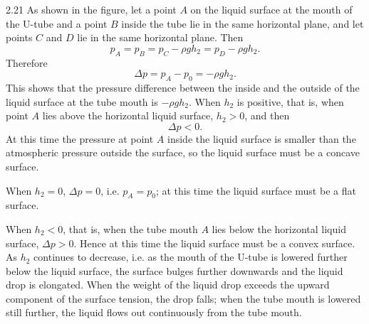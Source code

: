\begin{solution}{2.21}
As shown in the figure, let a point $A$ on the liquid surface at the mouth of the U-tube and a
point $B$ inside the tube lie in the same horizontal plane, and let points $C$ and $D$ lie in the
same horizontal plane. Then
\begin{equation*}
p_A = p_B = p_C - \rho gh_2 = p_D - \rho gh_2 .
\end{equation*}
Therefore
\begin{equation*}
\Delta p = p_A - p_0 = -\rho gh_2 .
\end{equation*}
This shows that the pressure difference between the inside and the outside of the liquid surface
at the tube mouth is $-\rho gh_2$. When $h_2$ is positive, that is, when point $A$ lies above the
horizontal liquid surface, $h_2>0$, and then
\begin{equation*}
\Delta p < 0 .
\end{equation*}
At this time the pressure at point $A$ inside the liquid surface is smaller than the atmospheric
pressure outside the surface, so the liquid surface must be a concave surface.

When $h_2=0$, $\Delta p=0$, i.e. $p_A=p_0$; at this time the liquid surface must be a flat
surface.

When $h_2<0$, that is, when the tube mouth $A$ lies below the horizontal liquid surface,
$\Delta p>0$. Hence at this time the liquid surface must be a convex surface. As $h_2$ continues
to decrease, i.e. as the mouth of the U-tube is lowered further below the liquid surface, the
surface bulges further downwards and the liquid drop is elongated. When the weight of the liquid
drop exceeds the upward component of the surface tension, the drop falls; when the tube mouth is
lowered still further, the liquid flows out continuously from the tube mouth.


\end{solution}
